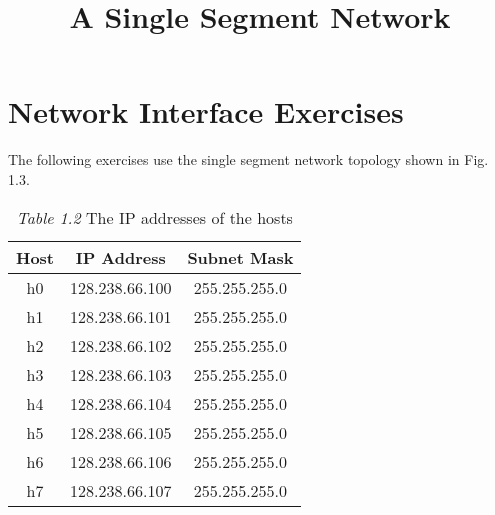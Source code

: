 \documentclass{../UTNetLab}
\title{A Single Segment Network}
\begin{document}
\part{Network Interface Exercises}
    The following exercises use the single segment network topology shown in Fig. 1.3.
    \begin{center}
        \begin{minipage}{0.48\textwidth}
            \begin{flushleft}
                \begin{table}[H]
                    \caption{\textit{Table 1.2} The IP addresses of the hosts}
                    \centering
                    \begin{tabular}{ c c c }
                        \hline \hline
                        Host & IP Address & Subnet Mask \\
                        \hline 
                        h0 & 128.238.66.100 & 255.255.255.0 \\
                        h1 & 128.238.66.101 & 255.255.255.0 \\
                        h2 & 128.238.66.102 & 255.255.255.0 \\
                        h3 & 128.238.66.103 & 255.255.255.0 \\
                        h4 & 128.238.66.104 & 255.255.255.0 \\
                        h5 & 128.238.66.105 & 255.255.255.0 \\
                        h6 & 128.238.66.106 & 255.255.255.0 \\
                        h7 & 128.238.66.107 & 255.255.255.0 \\
                        \hline \hline
                        \end{tabular}
                \end{table}
            \end{flushleft}
        \end{minipage}
        \begin{minipage}{0.48\textwidth}
            \begin{flushright}
                \begin{figure}[H]
                    \centering
\end{figure}
\end{flushright}
\end{minipage}
\end{center}
\end{document}
